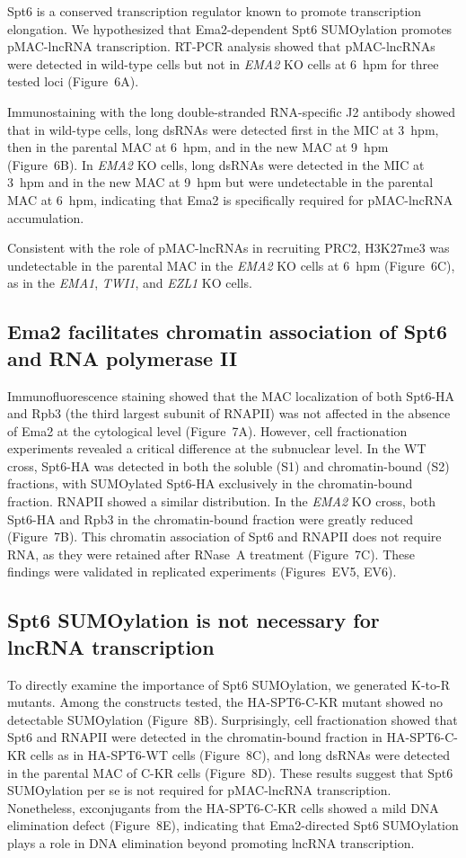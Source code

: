 \documentclass[11pt]{article}
\begin{document}
Spt6 is a conserved transcription regulator known to promote transcription elongation. We hypothesized that Ema2-dependent Spt6 SUMOylation promotes pMAC-lncRNA transcription. RT-PCR analysis showed that pMAC-lncRNAs were detected in wild-type cells but not in \textit{EMA2} KO cells at 6~hpm for three tested loci (Figure~6A).

Immunostaining with the long double-stranded RNA-specific J2 antibody \citep{schoenborn1991} showed that in wild-type cells, long dsRNAs were detected first in the MIC at 3~hpm, then in the parental MAC at 6~hpm, and in the new MAC at 9~hpm (Figure~6B). In \textit{EMA2} KO cells, long dsRNAs were detected in the MIC at 3~hpm and in the new MAC at 9~hpm but were undetectable in the parental MAC at 6~hpm, indicating that Ema2 is specifically required for pMAC-lncRNA accumulation.

Consistent with the role of pMAC-lncRNAs in recruiting PRC2, H3K27me3 was undetectable in the parental MAC in the \textit{EMA2} KO cells at 6~hpm (Figure~6C), as in the \textit{EMA1}, \textit{TWI1}, and \textit{EZL1} KO cells.

\subsection{Ema2 facilitates chromatin association of Spt6 and RNA polymerase II}

Immunofluorescence staining showed that the MAC localization of both Spt6-HA and Rpb3 (the third largest subunit of RNAPII) was not affected in the absence of Ema2 at the cytological level (Figure~7A). However, cell fractionation experiments revealed a critical difference at the subnuclear level. In the WT cross, Spt6-HA was detected in both the soluble (S1) and chromatin-bound (S2) fractions, with SUMOylated Spt6-HA exclusively in the chromatin-bound fraction. RNAPII showed a similar distribution. In the \textit{EMA2} KO cross, both Spt6-HA and Rpb3 in the chromatin-bound fraction were greatly reduced (Figure~7B). This chromatin association of Spt6 and RNAPII does not require RNA, as they were retained after RNase~A treatment (Figure~7C). These findings were validated in replicated experiments (Figures~EV5, EV6).

\subsection{Spt6 SUMOylation is not necessary for lncRNA transcription}

To directly examine the importance of Spt6 SUMOylation, we generated K-to-R mutants. Among the constructs tested, the HA-SPT6-C-KR mutant showed no detectable SUMOylation (Figure~8B). Surprisingly, cell fractionation showed that Spt6 and RNAPII were detected in the chromatin-bound fraction in HA-SPT6-C-KR cells as in HA-SPT6-WT cells (Figure~8C), and long dsRNAs were detected in the parental MAC of C-KR cells (Figure~8D). These results suggest that Spt6 SUMOylation per se is not required for pMAC-lncRNA transcription. Nonetheless, exconjugants from the HA-SPT6-C-KR cells showed a mild DNA elimination defect (Figure~8E), indicating that Ema2-directed Spt6 SUMOylation plays a role in DNA elimination beyond promoting lncRNA transcription.
\end{document}
